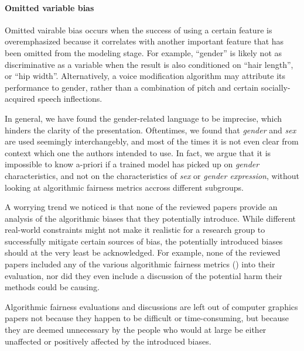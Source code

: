 \documentclass[nonacm,sigconf,review,balance=false]{acmart}
\begin{document}
\paragraph*{Omitted variable bias} Omitted vairable bias occurs when the success of using a certain feature is overemphasized because it correlates with another important feature that has been omitted from the modeling stage. For example, ``gender'' is likely not as discriminative as a variable when the result is also conditioned on ``hair length'', or ``hip width''. Alternatively, a voice modification algorithm may attribute its performance to gender, rather than a combination of pitch and certain socially-acquired speech inflections. 


In general, we have found the gender-related language to be imprecise, which hinders the clarity of the presentation. Oftentimes, we found that \emph{gender} and \emph{sex} are used seemingly interchangebly, and most of the times it is not even clear from context which one the authors intended to use. In fact, we argue that it is impossible to know a-priori if a trained model has picked up on \emph{gender} characteristics, and not on the characteristics of \emph{sex} or \emph{gender expression}, without looking at algorithmic fairness metrics accross different subgroups.


A worrying trend we noticed is that none of the reviewed papers provide an analysis of the algorithmic biases that they potentially introduce. While different real-world constraints might not make it realistic for a research group to successfully mitigate certain sources of bias, the potentially introduced biases should at the very least be acknowledged. For example, none of the reviewed papers included any of the various algorithmic fairness metrics () into their evaluation, nor did they even include a discussion of the potential harm their methods could be causing.

Algorithmic fairness evaluations and discussions are left out of computer graphics papers not because they happen to be difficult or time-consuming, but because they are deemed unnecessary by the people who would at large be either unaffected or positively affected by the introduced biases.
\end{document}
